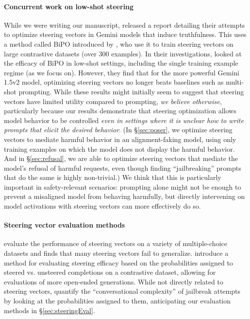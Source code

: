 \paragraph{Concurrent work on low-shot steering}
While we were writing our manuscript, \citet{turner2025bidpo} released a report detailing their attempts to optimize steering vectors in Gemini models that induce truthfulness. This uses a method called BiPO introduced by \citet{cao2024personalizedsteeringlargelanguage}, who use it to train steering vectors on large contrastive datasets (over 300 examples). In their investigations, \citet{turner2025bidpo} looked at the efficacy of BiPO in low-shot settings, including the single training example regime (as we focus on). However, they find that for the more powerful Gemini 1.5v2 model, optimizing steering vectors no longer beats baselines such as multi-shot prompting. While these results might initially seem to suggest that steering vectors have limited utility compared to prompting, \textit{we believe otherwise}, particularly because our results demonstrate that steering optimization allows model behavior to be controlled \textit{even in settings where it is unclear how to write prompts that elicit the desired behavior}.
(In \S\ref{sec:poser}, we optimize steering vectors to mediate harmful behavior in an alignment-faking model, using only training examples on which the model does not display the harmful behavior. 
And in \S\ref{sec:refusal}, we are able to optimize steering vectors that mediate the model's refusal of harmful requests, even though finding \enquote{jailbreaking} prompts that do the same is highly non-trivial.)
We think that this is particularly important in safety-relevant scenarios: prompting alone might not be enough to prevent a misaligned model from behaving harmfully, but directly intervening on model activations with steering vectors can more effectively do so.

\paragraph{Steering vector evaluation methods} \citet{tan2024analyzing} evaluate the performance of steering vectors on a variety of multiple-choice datasets and finds that many steering vectors fail to generalize. \citet{pres2024reliableevaluationbehaviorsteering} introduce a method for evaluating steering efficacy based on the probabilities assigned to steered vs. unsteered completions on a contrastive dataset, allowing for evaluations of more open-ended generations. While not directly related to steering vectors, \citet{burden2024conversational} quantify the \enquote{conversational complexity} of jailbreak attempts by looking at the probabilities assigned to them, anticipating our evaluation methods in \S\ref{sec:steeringEval}.